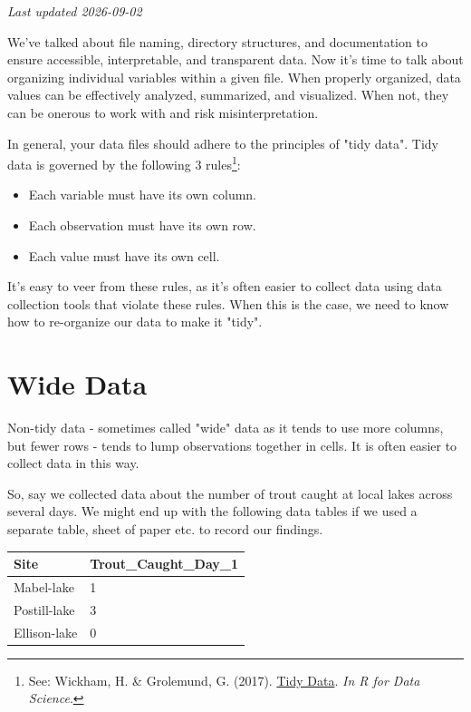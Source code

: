 \documentclass[
]{book}
\newcounter{none} %
\providecommand{\tightlist}{%
  \setlength{\itemsep}{0pt}\setlength{\parskip}{0pt}}
\begin{document}
\emph{Last updated 2026-09-02}

We've talked about file naming, directory structures, and documentation to ensure accessible, interpretable, and transparent data. Now it's time to talk about organizing individual variables within a given file. When properly organized, data values can be effectively analyzed, summarized, and visualized. When not, they can be onerous to work with and risk misinterpretation.

In general, your data files should adhere to the principles of "tidy data". Tidy data is governed by the following 3 rules\footnote{See: Wickham, H. \& Grolemund, G. (2017). \href{https://r4ds.had.co.nz/tidy-data.html}{Tidy Data}. \emph{In R for Data Science}.}:

\begin{itemize}
\tightlist
\item
  Each variable must have its own column.
\item
  Each observation must have its own row.
\item
  Each value must have its own cell.
\end{itemize}

It's easy to veer from these rules, as it's often easier to collect data using data collection tools that violate these rules. When this is the case, we need to know how to re-organize our data to make it "tidy".

\section{Wide Data}\label{wide-data}

Non-tidy data - sometimes called "wide" data as it tends to use more columns, but fewer rows - tends to lump observations together in cells. It is often easier to collect data in this way.

So, say we collected data about the number of trout caught at local lakes across several days. We might end up with the following data tables if we used a separate table, sheet of paper etc. to record our findings.

{\def\LTcaptype{none} %
\begin{longtable}[]{@{}ll@{}}
\toprule\noalign{}
Site & Trout\_Caught\_Day\_1 \\
\midrule\noalign{}
\endhead
\bottomrule\noalign{}
\endlastfoot
Mabel-lake & 1 \\
Postill-lake & 3 \\
Ellison-lake & 0 \\
\end{longtable}
}
\end{document}
